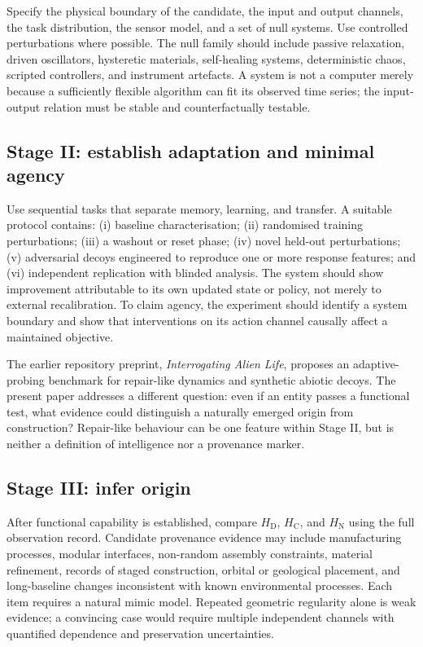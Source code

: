 \documentclass[11pt]{article}
\newcommand{\HD}{H_{\mathrm{D}}}
\newcommand{\HC}{H_{\mathrm{C}}}
\newcommand{\HN}{H_{\mathrm{N}}}
\begin{document}
Specify the physical boundary of the candidate, the input and output channels, the task distribution, the sensor model, and a set of null systems. Use controlled perturbations where possible. The null family should include passive relaxation, driven oscillators, hysteretic materials, self-healing systems, deterministic chaos, scripted controllers, and instrument artefacts. A system is not a computer merely because a sufficiently flexible algorithm can fit its observed time series; the input-output relation must be stable and counterfactually testable.

\subsection{Stage II: establish adaptation and minimal agency}

Use sequential tasks that separate memory, learning, and transfer. A suitable protocol contains: (i) baseline characterisation; (ii) randomised training perturbations; (iii) a washout or reset phase; (iv) novel held-out perturbations; (v) adversarial decoys engineered to reproduce one or more response features; and (vi) independent replication with blinded analysis. The system should show improvement attributable to its own updated state or policy, not merely to external recalibration. To claim agency, the experiment should identify a system boundary and show that interventions on its action channel causally affect a maintained objective.

The earlier repository preprint, \emph{Interrogating Alien Life}, proposes an adaptive-probing benchmark for repair-like dynamics and synthetic abiotic decoys. The present paper addresses a different question: even if an entity passes a functional test, what evidence could distinguish a naturally emerged origin from construction? Repair-like behaviour can be one feature within Stage II, but is neither a definition of intelligence nor a provenance marker.

\subsection{Stage III: infer origin}

After functional capability is established, compare $\HD$, $\HC$, and $\HN$ using the full observation record. Candidate provenance evidence may include manufacturing processes, modular interfaces, non-random assembly constraints, material refinement, records of staged construction, orbital or geological placement, and long-baseline changes inconsistent with known environmental processes. Each item requires a natural mimic model. Repeated geometric regularity alone is weak evidence; a convincing case would require multiple independent channels with quantified dependence and preservation uncertainties.
\end{document}
